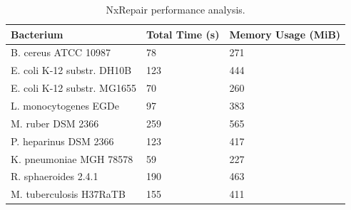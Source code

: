 \documentclass[fleqn,10pt]{wlpeerj}
\begin{document}
\begin{table}
\begin{center}
\begin{tabular}{lll}
    \hline
    Bacterium & Total Time (s) & Memory Usage (MiB) \\ \hline
    B. cereus ATCC 10987 & 78 & 271 \\
    E. coli K-12 substr. DH10B & 123 & 444 \\
    E. coli K-12 substr. MG1655 & 70 & 260 \\
    L. monocytogenes EGDe & 97 & 383 \\
    M. ruber DSM 2366 & 259 & 565 \\
    P. heparinus DSM 2366 & 123 & 417 \\
    K. pneumoniae MGH 78578 & 59 & 227 \\
    R. sphaeroides 2.4.1 & 190 & 463 \\
    M. tuberculosis H37RaTB & 155 & 411 \\ 
    \hline
\end{tabular}
\end{center}
\caption{NxRepair performance analysis. \label{tab:performance}}
\end{table}
\end{document}
